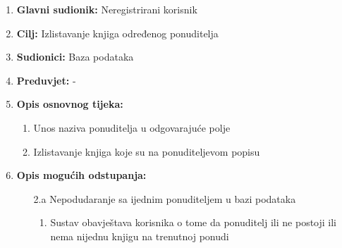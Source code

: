 \documentclass[12pt]{report}
\begin{document}
\noindent {}
\begin{enumerate}
	
	\item \textbf{Glavni sudionik: } Neregistrirani korisnik
	\item  \textbf{Cilj:} Izlistavanje knjiga određenog ponuditelja
	\item  \textbf{Sudionici:} Baza podataka
	\item  \textbf{Preduvjet:} -
	\item  \textbf{Opis osnovnog tijeka:}
	
	\begin{enumerate}
		
		\item Unos naziva ponuditelja u odgovarajuće polje
		\item Izlistavanje knjiga koje su na ponuditeljevom popisu
		
	\end{enumerate}
	
	\item  \textbf{Opis mogućih odstupanja:}
	
	\item[] \begin{enumerate}
		
		\item[2.a] Nepodudaranje sa ijednim ponuditeljem u bazi podataka
		\item[] \begin{enumerate}
			
			\item Sustav obavještava korisnika o tome da ponuditelj ili ne postoji ili nema nijednu knjigu na trenutnoj ponudi
			
		\end{enumerate}
		
	\end{enumerate}
	
\end{enumerate}
\end{document}
